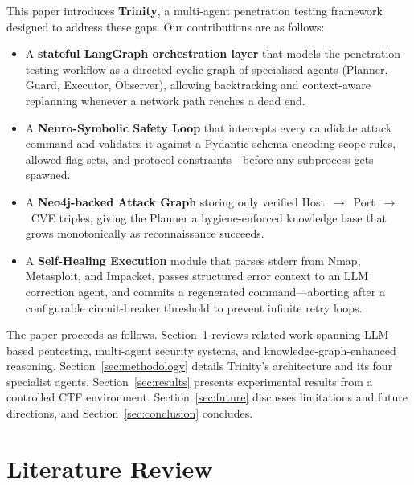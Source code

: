 \documentclass[conference]{IEEEtran}
\begin{document}
This paper introduces \textbf{Trinity}, a multi-agent penetration testing framework designed to address these gaps. Our contributions are as follows:

\begin{itemize}
    \item A \textbf{stateful LangGraph orchestration layer} that models the penetration-testing workflow as a directed cyclic graph of specialised agents (Planner, Guard, Executor, Observer), allowing backtracking and context-aware replanning whenever a network path reaches a dead end.
    
    \item A \textbf{Neuro-Symbolic Safety Loop} that intercepts every candidate attack command and validates it against a Pydantic schema encoding scope rules, allowed flag sets, and protocol constraints---before any subprocess gets spawned.
    
    \item A \textbf{Neo4j-backed Attack Graph} storing only verified \mbox{Host $\rightarrow$ Port $\rightarrow$ CVE} triples, giving the Planner a hygiene-enforced knowledge base that grows monotonically as reconnaissance succeeds.
    
    \item A \textbf{Self-Healing Execution} module that parses stderr from Nmap, Metasploit, and Impacket, passes structured error context to an LLM correction agent, and commits a regenerated command---aborting after a configurable circuit-breaker threshold to prevent infinite retry loops.
\end{itemize}

The paper proceeds as follows. Section~\ref{sec:litreview} reviews related work spanning LLM-based pentesting, multi-agent security systems, and knowledge-graph-enhanced reasoning. Section~\ref{sec:methodology} details Trinity's architecture and its four specialist agents. Section~\ref{sec:results} presents experimental results from a controlled CTF environment. Section~\ref{sec:future} discusses limitations and future directions, and Section~\ref{sec:conclusion} concludes.

\section{Literature Review}
\label{sec:litreview}
\end{document}
